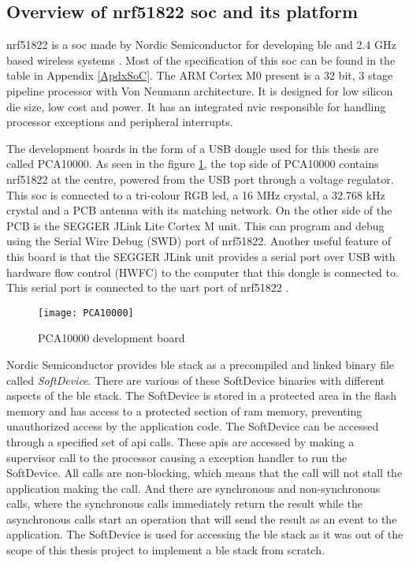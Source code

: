 \subsection{Overview of nrf51822 \gls{soc} and its platform} \label{5nrfPCA}

nrf51822 is a \gls{soc} made by Nordic Semiconductor for developing \gls{ble} and 2.4 GHz based wireless systems \cite{nrf51822page}. Most of the specification of this \gls{soc} can be found in the table in Appendix \ref{ApdxSoC}. The ARM Cortex M0 present is a 32 bit, 3 stage pipeline processor with Von Neumann architecture. It is designed for low silicon die size, low cost and power. It has an integrated \gls{nvic}  responsible for handling processor exceptions and peripheral interrupts. 

The development boards in the form of a USB dongle used for this thesis are called PCA10000. As seen in the figure \ref{pca10000}, the top side of PCA10000 contains nrf51822 at the centre, powered from the USB port through a voltage regulator. This \gls{soc} is connected to a tri-colour RGB led, a 16 MHz crystal, a 32.768  kHz crystal and a PCB antenna with its matching network. On the other side of the PCB is the SEGGER JLink Lite Cortex M unit. This can program and debug using the Serial Wire Debug (SWD) port of nrf51822. Another useful feature of this board is that the SEGGER JLink unit provides a serial port over USB with hardware flow control (HWFC) to the computer that this dongle is connected to. This serial port is connected to the \gls{uart} port of nrf51822 \cite{PrithviR}.

\begin{figure}[h]
\texttt{[image: PCA10000]}
\caption{PCA10000 development board}
\label{pca10000}
\end{figure} 

Nordic Semiconductor provides \gls{ble} stack as a precompiled and linked binary file called \emph{SoftDevice}. There are various of these SoftDevice binaries with different aspects of the \gls{ble} stack. The SoftDevice is stored in a protected area in the flash memory and has access to a protected section of \gls{ram} memory, preventing unauthorized access by the application code. The SoftDevice can be accessed through a specified set of \gls{api} calls. These \glspl{api} are accessed by making a supervisor call to the processor causing a exception handler to run the SoftDevice. All calls are non-blocking, which means that the call will not stall the application making the call. And there are synchronous and non-synchronous calls, where the synchronous calls immediately return the result while the asynchronous calls start an operation that will send the result as an event to the application. The SoftDevice is used for accessing the \gls{ble} stack as it was out of the scope of this thesis project to implement a \gls{ble} stack from scratch.


